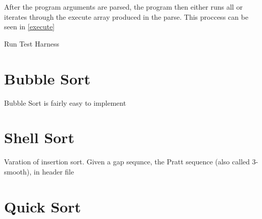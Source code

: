 \documentclass[12pt]{article}
\begin{document}
	After the program arguments are parsed, the program then either runs all or iterates through the execute array produced in the parse. This proccess can be seen in \vref{execute}

	\begin{algorithm}
		\caption{Run Test Harness}\label{execute}
	\end{algorithm}

	\section{Bubble Sort}

	Bubble Sort is fairly easy to implement

	\section{Shell Sort}

	Varation of insertion sort.
	Given a gap sequnce, the Pratt sequence (also called 3-smooth), in header file
	\section{Quick Sort}
\end{document}
